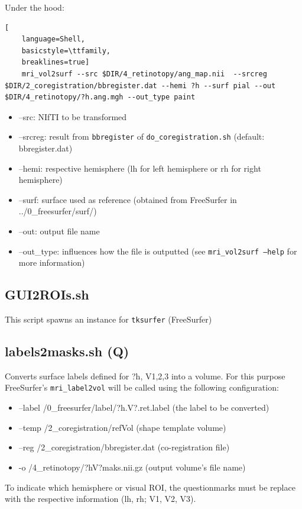 \documentclass[12pt,a4paper]{scrartcl}
\begin{document}
\noindent Under the hood:
\begin{lstlisting}[
    language=Shell,
    basicstyle=\ttfamily,
    breaklines=true]
    mri_vol2surf --src $DIR/4_retinotopy/ang_map.nii  --srcreg $DIR/2_coregistration/bbregister.dat --hemi ?h --surf pial --out $DIR/4_retinotopy/?h.ang.mgh --out_type paint
\end{lstlisting}
\begin{itemize}
\item --src: NIfTI to be transformed
\item --srcreg: result from \texttt{bbregister} of \texttt{do\_coregistration.sh} (default: bbregister.dat)
\item --hemi: respective hemisphere (lh for left hemisphere or rh for right hemisphere)
\item --surf: surface used as reference (obtained from FreeSurfer in ../0\_freesurfer/surf/)
\item --out: output file name
\item --out\_type: influences how the file is outputted (see \texttt{mri\_vol2surf --help} for more information)
\end{itemize}

\subsection{GUI2ROIs.sh}
\label{sec:GUI2ROI}
This script spawns an instance for \texttt{tksurfer} (FreeSurfer)

\subsection{labels2masks.sh (Q)}
\label{sec:lbl2msk}
Converts surface labels defined for ?h, V1,2,3 into a volume. For this purpose FreeSurfer's \texttt{mri\_label2vol} will be called using the following configuration:
\begin{itemize}
  \item --label /0\_freesurfer/label/?h.V?.ret.label (the label to be converted)
  \item --temp /2\_coregistration/refVol (shape template volume)
  \item --reg /2\_coregistration/bbregister.dat (co-registration file)
  \item -o /4\_retinotopy/?hV?maks.nii.gz (output volume's file name)
\end{itemize}

To indicate which hemisphere or visual ROI, the questionmarks must be replace with the respective information (lh, rh; V1, V2, V3).\\
\end{document}
